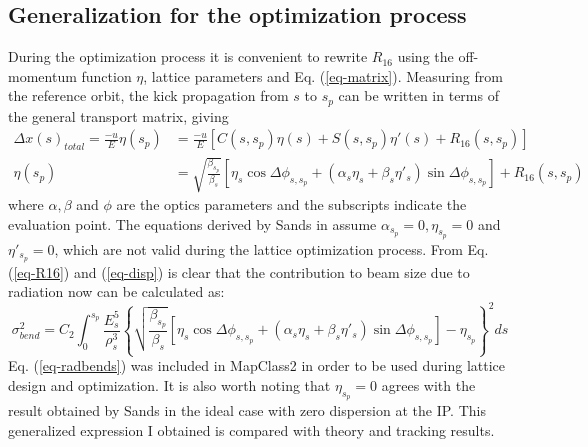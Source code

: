\subsection{Generalization for the optimization process}\label{s:thebeamrad}
During the optimization process it is convenient to rewrite $R_{16}$ using the off-momentum function $\eta$, lattice parameters and Eq. (\ref{eq-matrix}). Measuring from the reference orbit, the kick propagation from $s$ to $s_p$ can be written in terms of the general transport matrix, giving
\begin{align}
\Delta x(s)_{total}=\frac{-u}{E}\eta(s_p) &= \frac{-u}{E} \left[C(s,s_p)\eta(s) + S(s,s_p)\eta'(s) + R_{16}(s,s_p)\right]\\
\eta(s_p) &= \sqrt{\frac{\beta_{s_p}}{\beta_s}}\left[\eta_s\cos\Delta\phi_{s,s_p}+(\alpha_s\eta_s+\beta_s\eta'_s)\sin\Delta\phi_{s,s_p}\right] + R_{16}(s,s_p)\label{eq-disp}
\end{align}
where $\alpha, \beta$ and $\phi$ are the optics parameters and the subscripts indicate the evaluation point. The equations derived by Sands in \cite{Sands} assume $\alpha_{s_p}=0, \eta_{s_p}=0$ and $\eta'_{s_p}=0$, which are not valid during the lattice optimization process. From Eq. (\ref{eq-R16}) and (\ref{eq-disp}) is clear that the contribution to beam size due to radiation now can be calculated as:
\begin{equation}
 \sigma_{bend}^2=C_2 \int_0^{s_p} \frac{E^5_s}{\rho^3_s}\left\{\sqrt{\frac{\beta_{s_p}}{\beta_s}}\left[\eta_s\cos\Delta\phi_{s,s_p}+(\alpha_s\eta_s+\beta_s\eta'_s)\sin\Delta\phi_{s,s_p}\right]-\eta_{s_p}\right\}^2ds\label{eq-radbends}
\end{equation}
Eq. (\ref{eq-radbends}) was included in MapClass2 in order to be used during lattice design and optimization. It is also worth noting that $\eta_{s_p}=0$ agrees with the result obtained by Sands in the ideal case with zero dispersion at the IP. This generalized expression I obtained is compared with theory and tracking results.

